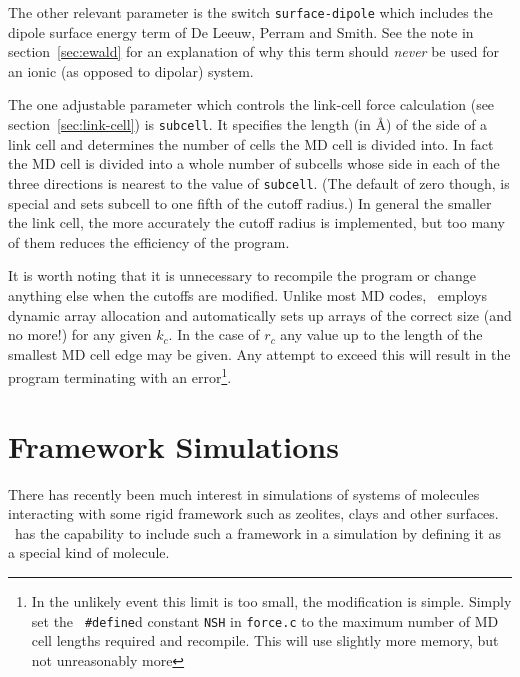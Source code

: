 The other relevant parameter is the switch \verb'surface-dipole' which
includes the dipole surface energy term of De Leeuw, Perram and
Smith\cite{deleeuw:8?}.  See the note in section~\ref{sec:ewald} for an
explanation of why this term should {\em never} be used for an ionic
(as opposed to dipolar) system.

The one adjustable parameter which controls the link-cell force
calculation (see section~\ref{sec:link-cell}) is \verb'subcell'. It
specifies the length (in \AA) of the side of a link cell and determines
the number of cells the MD cell is divided into. In fact the MD cell
is divided into a whole number of subcells whose side in each of the
three directions is nearest to the value of \verb'subcell'.  (The
default of zero though, is special and sets subcell to one fifth of
the cutoff radius.) In general the smaller the link cell, the more
accurately the cutoff radius is implemented, but too many of them
reduces the efficiency of the program.

It is worth noting that it is unnecessary to recompile the program or
change anything else when the cutoffs are modified. Unlike most MD
codes, \moldy\  employs dynamic array allocation and automatically sets
up arrays of the correct size (and no more!) for any given $k_{c}$.
In the case of $r_{c}$ any value up to the length of the smallest MD
cell edge may be given. Any attempt to exceed this will result in the
program terminating with an error\footnote{In the unlikely event this
limit is too small, the modification is simple.  Simply set the {\tt
\#define}d constant {\tt NSH} in {\tt force.c} to the maximum number of
MD cell lengths required and recompile.  This will use slightly more
memory, but not unreasonably more}.

\section{Framework Simulations}

There has recently been much interest in simulations of systems of
molecules interacting with some rigid framework such as zeolites,
clays and other surfaces.  \moldy\  has the capability to include such a
framework in a simulation by defining it as a special kind of molecule.

